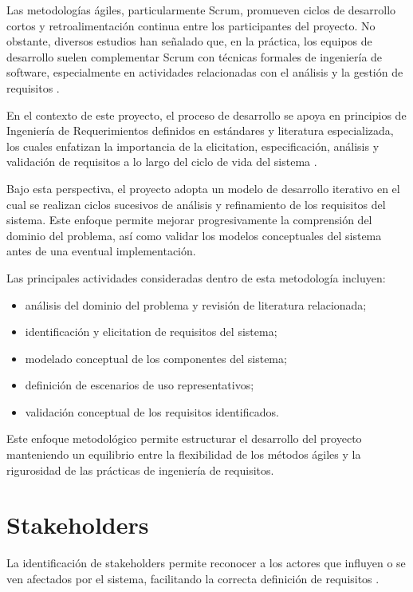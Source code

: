 \documentclass[12pt]{article}
\begin{document}
Las metodologías ágiles, particularmente Scrum, promueven ciclos de desarrollo cortos y retroalimentación continua entre los participantes del proyecto. No obstante, diversos estudios han señalado que, en la práctica, los equipos de desarrollo suelen complementar Scrum con técnicas formales de ingeniería de software, especialmente en actividades relacionadas con el análisis y la gestión de requisitos \cite{Dada20221429}.

En el contexto de este proyecto, el proceso de desarrollo se apoya en principios de Ingeniería de Requerimientos definidos en estándares y literatura especializada, los cuales enfatizan la importancia de la elicitation, especificación, análisis y validación de requisitos a lo largo del ciclo de vida del sistema \cite{ISO29148,Wiegers2013}.

Bajo esta perspectiva, el proyecto adopta un modelo de desarrollo iterativo en el cual se realizan ciclos sucesivos de análisis y refinamiento de los requisitos del sistema. Este enfoque permite mejorar progresivamente la comprensión del dominio del problema, así como validar los modelos conceptuales del sistema antes de una eventual implementación.

Las principales actividades consideradas dentro de esta metodología incluyen:

\begin{itemize}
\item análisis del dominio del problema y revisión de literatura relacionada;
\item identificación y elicitation de requisitos del sistema;
\item modelado conceptual de los componentes del sistema;
\item definición de escenarios de uso representativos;
\item validación conceptual de los requisitos identificados.
\end{itemize}

Este enfoque metodológico permite estructurar el desarrollo del proyecto manteniendo un equilibrio entre la flexibilidad de los métodos ágiles y la rigurosidad de las prácticas de ingeniería de requisitos.
	\section{Stakeholders}
	
	La identificación de stakeholders permite reconocer a los actores que influyen o se ven
	afectados por el sistema, facilitando la correcta definición de requisitos \cite{Wiegers2013}.
	
\end{document}
